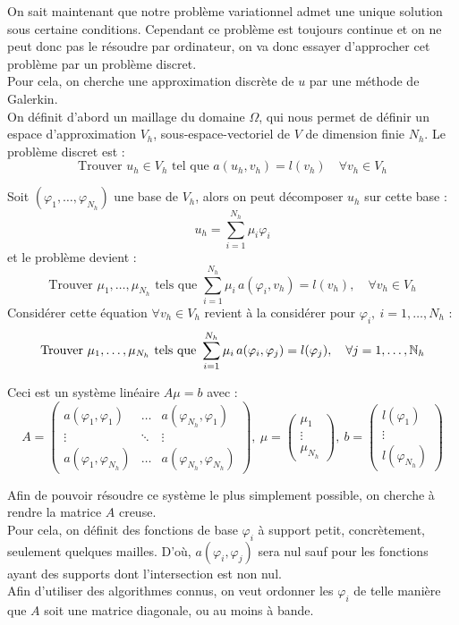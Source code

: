 On sait maintenant que notre problème variationnel admet une unique solution sous certaine conditions. Cependant ce problème est toujours continue et on ne peut donc pas le résoudre par ordinateur, on va donc essayer d'approcher cet problème par un problème discret.\\
Pour cela, on cherche une approximation discrète de $u$ par une méthode de Galerkin.\\

On définit d'abord un maillage du domaine $\Omega$, qui nous permet de définir un espace d'approximation $V_h$, sous-espace-vectoriel de $V$ de dimension finie $N_h$. Le problème discret est :
\[ \mbox{Trouver } u_h\in V_h \mbox{ tel que } a(u_h,v_h)=l(v_h)\quad \forall v_h\in V_h \]

Soit $(\varphi_1,\dots,\varphi_{N_h})$ une base de $V_h$, alors on peut décomposer $u_h$ sur cette base :
\[ u_h = \sum_{i=1}^{N_h} \mu_i\varphi_i \]
et le problème devient :
\[ \mbox{Trouver } \mu_1,\dots,\mu_{N_h} \mbox{ tels que } \sum_{i=1}^{N_h} \mu_i\,a(\varphi_i,v_h)=l(v_h),\quad \forall v_h\in V_h \]
Considérer cette équation $\forall v_h\in V_h$ revient à la considérer pour $\varphi_i,\ i=1,\dots,N_h$ :
\[ \mbox{Trouver } \mu_1,\dots,\mu_{N_h} \mbox{ tels que } \sum_{i=1}^{N_h} \mu_i\,a(\varphi_i,\varphi_j)=l(\varphi_j),\quad \forall j=1,\dots,{\mathbb{N}}_h \]

Ceci est un système linéaire $A\mu = b$ avec :
\[ A=\begin{pmatrix} a(\varphi_1,\varphi_1) & \dots & a(\varphi_{N_h},\varphi_1)\\
\vdots & \ddots & \vdots\\
a(\varphi_1,\varphi_{N_h}) & \dots & a(\varphi_{N_h},\varphi_{N_h}) \end{pmatrix},\ 
\mu=\begin{pmatrix} \mu_1\\ \vdots\\ \mu_{N_h}\end{pmatrix},\ 
b=\begin{pmatrix} l(\varphi_1)\\ \vdots\\ l(\varphi_{N_h}) \end{pmatrix}\]

Afin de pouvoir résoudre ce système le plus simplement possible, on cherche à rendre la matrice $A$ creuse.\\
Pour cela, on définit des fonctions de base $\varphi_i$ à support petit, concrètement, seulement quelques mailles. D'où, $a(\varphi_i,\varphi_j)$ sera nul sauf pour les fonctions ayant des supports dont l'intersection est non nul.\\
Afin d'utiliser des algorithmes connus, on veut ordonner les $\varphi_i$ de telle manière que $A$ soit une matrice diagonale, ou au moins à bande.\\

